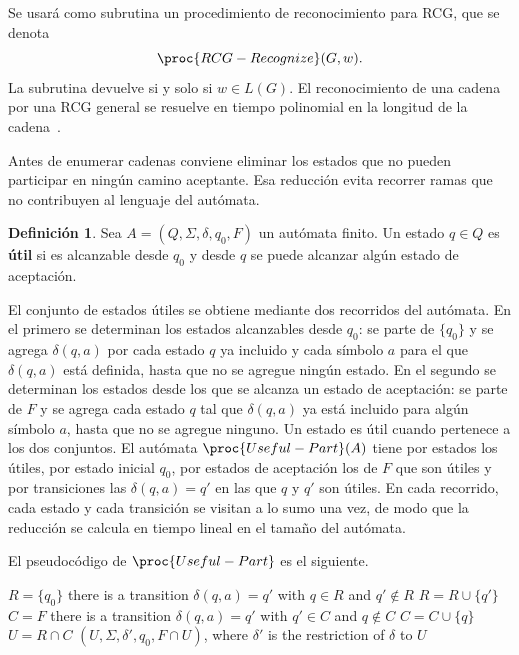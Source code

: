 \documentclass{report}
\theoremstyle{definition}
\newtheorem{definicion}{Definición}[chapter]
\theoremstyle{plain}
\theoremstyle{remark}
\begin{document}
Se usará como subrutina un procedimiento de reconocimiento para RCG, que
se denota
\[
  \proc{RCG-Recognize}(G,w).
\]
La subrutina devuelve  si y solo si $w \in L(G)$. El
reconocimiento de una cadena por una RCG general se resuelve en tiempo
polinomial en la longitud de la
cadena~\cite{bertsch2001rcg,kallmeyer2010parsing}.

Antes de enumerar cadenas conviene eliminar los estados que no pueden
participar en ningún camino aceptante. Esa reducción evita recorrer
ramas que no contribuyen al lenguaje del autómata.

\begin{definicion}
Sea $A=(Q,\Sigma,\delta,q_0,F)$ un autómata finito. Un estado $q\in Q$
es \textbf{útil} si es alcanzable desde $q_0$ y desde
$q$ se puede alcanzar algún estado de aceptación.
\end{definicion}

El conjunto de estados útiles se obtiene mediante dos recorridos del
autómata. En el primero se determinan los estados alcanzables desde
$q_0$: se parte de $\{q_0\}$ y se agrega $\delta(q,a)$ por cada estado
$q$ ya incluido y cada símbolo $a$ para el que $\delta(q,a)$ está
definida, hasta que no se agregue ningún estado. En el segundo se
determinan los estados desde los que se alcanza un estado de aceptación:
se parte de $F$ y se agrega cada estado $q$ tal que $\delta(q,a)$ ya
está incluido para algún símbolo $a$, hasta que no se agregue ninguno.
Un estado es útil cuando pertenece a los dos conjuntos. El autómata
$\proc{Useful-Part}(A)$ tiene por estados los útiles, por estado inicial
$q_0$, por estados de aceptación los de $F$ que son útiles y por
transiciones las $\delta(q,a)=q'$ en las que $q$ y $q'$ son útiles. En
cada recorrido, cada estado y cada transición se visitan a lo sumo una
vez, de modo que la reducción se calcula en tiempo lineal en el tamaño
del autómata.

El pseudocódigo de $\proc{Useful-Part}$ es el siguiente.

\begin{codebox}
\li $R = \{q_0\}$
\li \While there is a transition $\delta(q,a)=q'$ with $q \in R$ and $q' \notin R$
\li \Do $R = R \cup \{q'\}$
    \End
\li $C = F$
\li \While there is a transition $\delta(q,a)=q'$ with $q' \in C$ and $q \notin C$
\li \Do $C = C \cup \{q\}$
    \End
\li $U = R \cap C$
\li \Return $(U, \Sigma, \delta', q_0, F \cap U)$, where $\delta'$ is the
    restriction of $\delta$ to $U$
\end{codebox}
\end{document}
